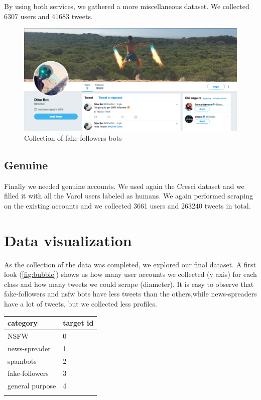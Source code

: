 By using both services, we gathered a more miscellaneous dataset.
We collected 6307 users and 41683 tweets.
\begin{figure}
	\centering
	\includegraphics[width=\columnwidth]{chapter3/figure/dibebot.png}
	\caption{Collection of fake-followers bots}
	\label{fig:dibebot}
\end{figure}

\subsection{Genuine}
Finally we needed genuine accounts. We used again the Cresci dataset \cite{Cresci} and we filled it with all the Varol users labeled as humans. We again performed scraping on the existing accounts and we collected 3661 users and 263240 tweets in total.

\newpage

\section{Data visualization}
As the collection of the data was completed, we explored our final dataset.
A first look (\ref{fig:bubble}) shows us how many user accounts we collected (y axis) for each class and how many tweets we could scrape (diameter). It is easy to observe that fake-followers and nsfw bots have less tweets than the others,while news-spreaders have a lot of tweets, but we collected less profiles.
\begin{center}
	\begin{tabular}{ll}
		\\category&target id\\
		\hline\hline
		NSFW&0\\
		news-spreader&1\\
		spambots&2\\
		fake-followers&3\\
		general purpose&4\\\hline\\		
	\end{tabular}
\end{center}


